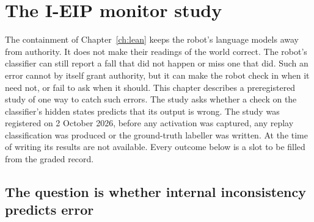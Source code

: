 \chapter{The I-EIP monitor study}\label{ch:ieip}

The containment of Chapter~\ref{ch:lean} keeps the robot's language models away from authority.
It does not make their readings of the world correct.
The robot's classifier can still report a fall that did not happen or miss one that did.
Such an error cannot by itself grant authority, but it can make the robot check in when it
need not, or fail to ask when it should.
This chapter describes a preregistered study of one way to catch such errors.
The study asks whether a check on the classifier's hidden states predicts that its output is
wrong.
The study was registered on 2 October 2026, before any activation was captured, any replay
classification was produced or the ground-truth labeller was written.
At the time of writing its results are not available.
Every outcome below is a slot to be filled from the graded record.

\section{The question is whether internal inconsistency predicts error}

